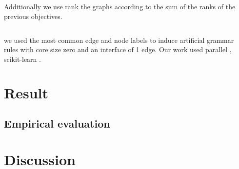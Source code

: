 \documentclass{esannV2} \usepackage[dvips]{graphicx}
\begin{document}
Additionally we use rank the graphs according to the sum of the ranks of the
previous objectives.



\subsection*{} we used the most common edge and node labels to induce
artificial grammar rules with core size zero and an interface of 1 edge.  Our
work used parallel \cite{parallel}, scikit-learn \cite{scikit-learn}. 


\section{Result}

\subsection{Empirical evaluation}




\section{Discussion} 


  
\end{document}
